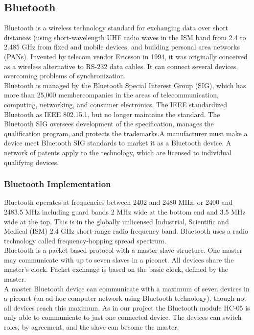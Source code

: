 \subsection{Bluetooth}
Bluetooth is a wireless technology standard for exchanging data over short distances (using short-wavelength UHF radio waves in the ISM band from 2.4 to 2.485 GHz from fixed and mobile devices, and building personal area networks (PANs). Invented by telecom vendor Ericsson in 1994, it was originally conceived as a wireless alternative to RS-232 data cables. It can connect several devices, overcoming problems of synchronization.\\
Bluetooth is managed by the Bluetooth Special Interest Group (SIG), which has more than 25,000 member\cite{bluetooth}companies in the areas of telecommunication, computing, networking, and consumer electronics. The IEEE standardized Bluetooth as IEEE 802.15.1, but no longer maintains the standard. The Bluetooth SIG oversees development of the specification, manages the qualification program, and protects the trademarks.A manufacturer must make a device meet Bluetooth SIG standards to market it as a Bluetooth device. A network of patents apply to the technology, which are licensed to individual qualifying devices.
\subsubsection{Bluetooth Implementation}
Bluetooth operates at frequencies between 2402 and 2480 MHz, or 2400 and 2483.5 MHz including guard bands 2 MHz wide at the bottom end and 3.5 MHz wide at the top. This is in the globally unlicensed Industrial, Scientific and Medical (ISM) 2.4 GHz short-range radio frequency band. Bluetooth uses a radio technology called frequency-hopping spread spectrum.\\
 Bluetooth is a packet-based protocol with a master-slave structure. One master may communicate with up to seven slaves in a piconet. All devices share the master's clock. Packet exchange is based on the basic clock, defined by the master.\\
A master Bluetooth device can communicate with a maximum of seven devices in a piconet (an ad-hoc computer network using Bluetooth technology), though not all devices reach this maximum. As in our project the Bluetooth module HC-05 is only able to communicate to just one connected device. The devices can switch roles, by agreement, and the slave can become the master.
